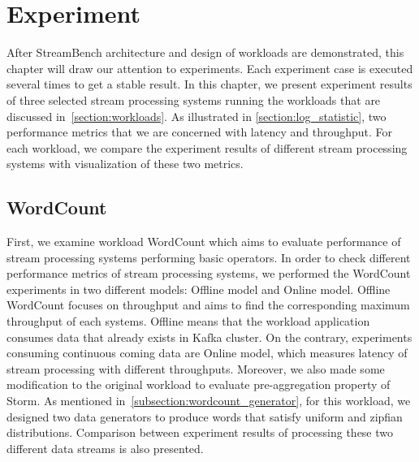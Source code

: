 \chapter{Experiment}
\label{chapter:experiment}

After StreamBench architecture and design of workloads are demonstrated, this chapter will draw our attention to experiments. Each experiment case is executed several times to get a stable result. In this chapter, we present experiment results of three selected stream processing systems running the workloads that are discussed in~\cref{section:workloads}. As illustrated in \cref{section:log_statistic}, two performance metrics that we are concerned with latency and throughput. For each workload, we compare the experiment results of different stream processing systems with visualization of these two metrics. 

\section{WordCount}
\label{section:wordcount_experiment}

First, we examine workload WordCount which aims to evaluate performance of stream processing systems performing basic operators. In order to check different performance metrics of stream processing systems, we performed the WordCount experiments in two different models: Offline model and Online model. Offline WordCount focuses on throughput and aims to find the corresponding maximum throughput of each systems. Offline means that the workload application consumes data that already exists in Kafka cluster. On the contrary, experiments consuming continuous coming data are Online model, which measures latency of stream processing with different throughputs. Moreover, we also made some modification to the original workload to evaluate pre-aggregation property of Storm.  As mentioned in~\cref{subsection:wordcount_generator}, for this workload, we designed two data generators to produce words that satisfy uniform and zipfian distributions. Comparison between experiment results of processing these two different data streams is also presented. 


